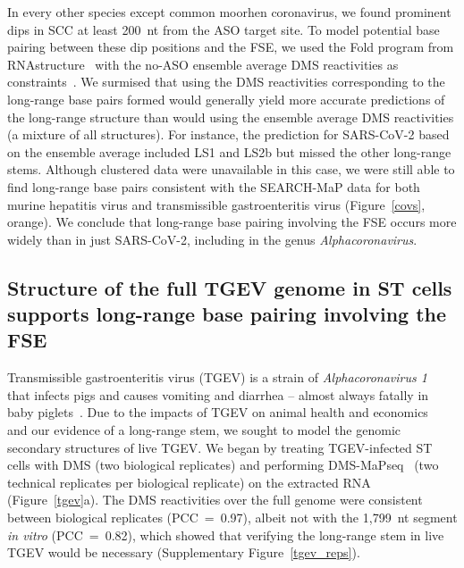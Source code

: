 \documentclass[main.tex]{subfiles}
\begin{document}
In every other species except common moorhen coronavirus, we found prominent dips in SCC at least 200~nt from the ASO target site.
To model potential base pairing between these dip positions and the FSE, we used the Fold program from RNAstructure~\cite{Reuter2010} with the no-ASO ensemble average DMS reactivities as constraints~\cite{Cordero2012}.
We surmised that using the DMS reactivities corresponding to the long-range base pairs formed would generally yield more accurate predictions of the long-range structure than would using the ensemble average DMS reactivities (a mixture of all structures).
For instance, the prediction for SARS-CoV-2 based on the ensemble average included LS1 and LS2b but missed the other long-range stems.
Although clustered data were unavailable in this case, we were still able to find long-range base pairs consistent with the SEARCH-MaP data for both murine hepatitis virus and transmissible gastroenteritis virus (Figure~\ref{covs}, orange).
We conclude that long-range base pairing involving the FSE occurs more widely than in just SARS-CoV-2, including in the genus \textit{Alphacoronavirus}.

\subsection{Structure of the full TGEV genome in ST cells supports long-range base pairing involving the FSE}

Transmissible gastroenteritis virus (TGEV) is a strain of \textit{Alphacoronavirus 1}~\cite{Whittaker2018} that infects pigs and causes vomiting and diarrhea -- almost always fatally in baby piglets~\cite{Liu2021}.
Due to the impacts of TGEV on animal health and economics~\cite{Liu2021} and our evidence of a long-range stem, we sought to model the genomic secondary structures of live TGEV.
We began by treating TGEV-infected ST cells with DMS (two biological replicates) and performing DMS-MaPseq~\cite{Zubradt2016} (two technical replicates per biological replicate) on the extracted RNA (Figure~\ref{tgev}a).
The DMS reactivities over the full genome were consistent between biological replicates (PCC~=~0.97), albeit not with the 1,799~nt segment \textit{in vitro} (PCC~=~0.82), which showed that verifying the long-range stem in live TGEV would be necessary (Supplementary Figure~\ref{tgev_reps}).
\end{document}
